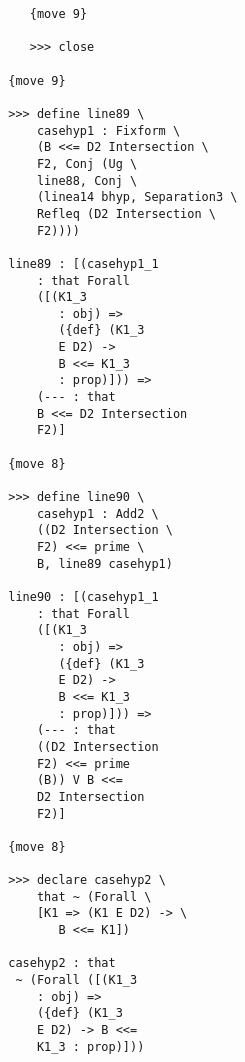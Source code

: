 \documentclass[12pt]{article}
\begin{document}
\begin{verbatim}
                              {move 9}

                              >>> close

                           {move 9}

                           >>> define line89 \
                               casehyp1 : Fixform \
                               (B <<= D2 Intersection \
                               F2, Conj (Ug \
                               line88, Conj \
                               (linea14 bhyp, Separation3 \
                               Refleq (D2 Intersection \
                               F2))))

                           line89 : [(casehyp1_1 
                               : that Forall 
                               ([(K1_3 
                                  : obj) => 
                                  ({def} (K1_3 
                                  E D2) -> 
                                  B <<= K1_3 
                                  : prop)])) => 
                               (--- : that 
                               B <<= D2 Intersection 
                               F2)]

                           {move 8}

                           >>> define line90 \
                               casehyp1 : Add2 \
                               ((D2 Intersection \
                               F2) <<= prime \
                               B, line89 casehyp1)

                           line90 : [(casehyp1_1 
                               : that Forall 
                               ([(K1_3 
                                  : obj) => 
                                  ({def} (K1_3 
                                  E D2) -> 
                                  B <<= K1_3 
                                  : prop)])) => 
                               (--- : that 
                               ((D2 Intersection 
                               F2) <<= prime 
                               (B)) V B <<= 
                               D2 Intersection 
                               F2)]

                           {move 8}

                           >>> declare casehyp2 \
                               that ~ (Forall \
                               [K1 => (K1 E D2) -> \
                                  B <<= K1])

                           casehyp2 : that 
                            ~ (Forall ([(K1_3 
                               : obj) => 
                               ({def} (K1_3 
                               E D2) -> B <<= 
                               K1_3 : prop)]))


\end{verbatim}
\end{document}
